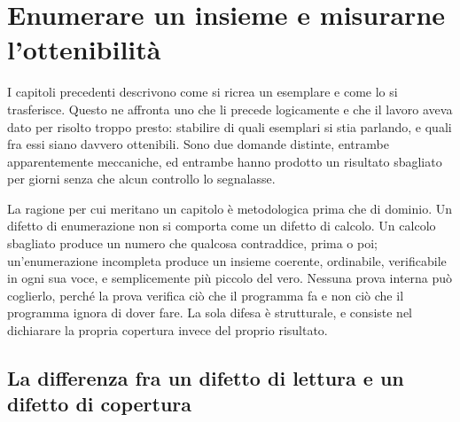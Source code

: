 
\chapter{Enumerare un insieme e misurarne l'ottenibilità}
\label{cap:enumerazione}

I capitoli precedenti descrivono come si ricrea un esemplare e come lo si trasferisce. Questo ne affronta uno che li precede logicamente e che il lavoro aveva dato per risolto troppo presto: stabilire di quali esemplari si stia parlando, e quali fra essi siano davvero ottenibili. Sono due domande distinte, entrambe apparentemente meccaniche, ed entrambe hanno prodotto un risultato sbagliato per giorni senza che alcun controllo lo segnalasse.

La ragione per cui meritano un capitolo è metodologica prima che di dominio. Un difetto di enumerazione non si comporta come un difetto di calcolo. Un calcolo sbagliato produce un numero che qualcosa contraddice, prima o poi; un'enumerazione incompleta produce un insieme coerente, ordinabile, verificabile in ogni sua voce, e semplicemente più piccolo del vero. Nessuna prova interna può coglierlo, perché la prova verifica ciò che il programma fa e non ciò che il programma ignora di dover fare. La sola difesa è strutturale, e consiste nel dichiarare la propria copertura invece del proprio risultato.

\section{La differenza fra un difetto di lettura e un difetto di copertura}


